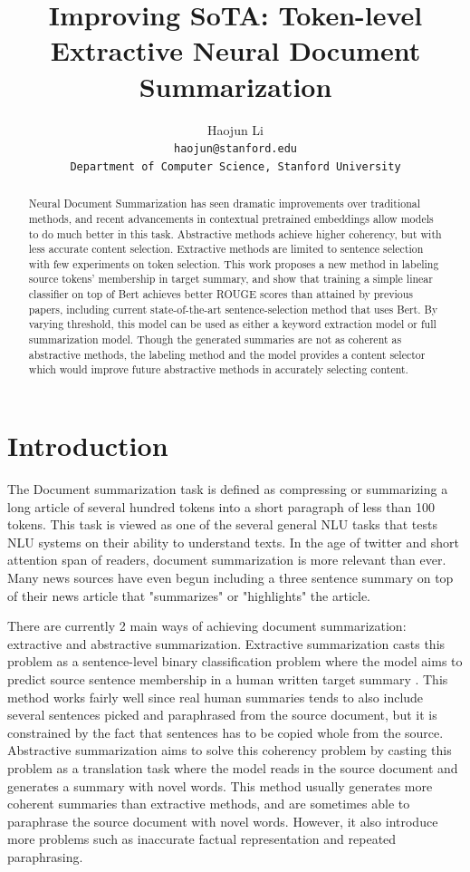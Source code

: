 \documentclass[11pt,a4paper]{article}
\title{Improving SoTA: Token-level Extractive Neural Document Summarization}
\author{Haojun Li \\
  \texttt{haojun@stanford.edu}\\
  \texttt{Department of Computer Science, Stanford University}
}
\date{}
\begin{document}
\maketitle
\begin{abstract}
	Neural Document Summarization has seen dramatic improvements over traditional methods, and recent advancements in contextual pretrained embeddings allow models to do much better in this task. Abstractive methods achieve higher coherency, but with less accurate content selection. Extractive methods are limited to sentence selection with few experiments on token selection. This work proposes a new method in labeling source tokens' membership in target summary, and show that training a simple linear classifier on top of Bert achieves better ROUGE scores than attained by previous papers, including current state-of-the-art sentence-selection method that uses Bert. By varying threshold, this model can be used as either a keyword extraction model or full summarization model. Though the generated summaries are not as coherent as abstractive methods, the labeling method and the model provides a content selector which would improve future abstractive methods in accurately selecting content.
\end{abstract}

\section{Introduction}
	The Document summarization task is defined as compressing or summarizing a long article of several hundred tokens into a short paragraph of less than 100 tokens. This task is viewed as one of the several general NLU tasks that tests NLU systems on their ability to understand texts. In the age of twitter and short attention span of readers, document summarization is more relevant than ever. Many news sources have even begun including a three sentence summary on top of their news article that "summarizes" or "highlights" the article.  
	
	There are currently 2 main ways of achieving document summarization: extractive and abstractive summarization. Extractive summarization casts this problem as a sentence-level binary classification problem where the model aims to predict source sentence membership in a human written target summary \cite{SummaRuNNer} \cite{al2018hierarchical} \cite{bert-sum}. This method works fairly well since real human summaries tends to also include several sentences picked and paraphrased from the source document, but it is constrained by the fact that sentences has to be copied whole from the source. Abstractive summarization aims to solve this coherency problem by casting this problem as a translation task where the model reads in the source document and generates a summary with novel words.\cite{bottom-up} \cite{lead} \cite{dca} \cite{pointer-generator} This method usually generates more coherent summaries than extractive methods, and are sometimes able to paraphrase the source document with novel words. However, it also introduce more problems such as inaccurate factual representation and repeated paraphrasing. 
	
\end{document}
